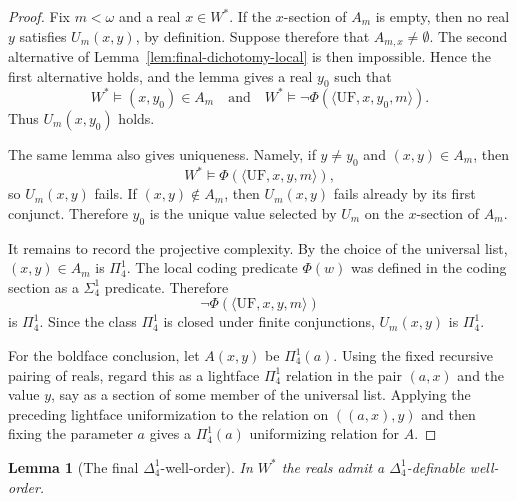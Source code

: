 \documentclass[a4paper,11pt]{article}
\newtheorem{lemma}[theorem]{Lemma}
\begin{document}
\begin{proof}
Fix \(m<\omega\) and a real \(x\in W^\ast\).  If the \(x\)-section of \(A_m\) is empty, then no real \(y\) satisfies \(U_m(x,y)\), by definition.  Suppose therefore that \(A_{m,x}\neq\emptyset\).  The second alternative of Lemma~\ref{lem:final-dichotomy-local} is then impossible.  Hence the first alternative holds, and the lemma gives a real \(y_0\) such that
\[
   W^\ast\models (x,y_0)\in A_m
   \quad\text{and}\quad
   W^\ast\models \neg\Phi(\langle\mathrm{UF},x,y_0,m\rangle).
\]
Thus \(U_m(x,y_0)\) holds.

The same lemma also gives uniqueness.  Namely, if \(y\neq y_0\) and \((x,y)\in A_m\), then
\[
   W^\ast\models \Phi(\langle\mathrm{UF},x,y,m\rangle),
\]
so \(U_m(x,y)\) fails.  If \((x,y)\notin A_m\), then \(U_m(x,y)\) fails already by its first conjunct.  Therefore \(y_0\) is the unique value selected by \(U_m\) on the \(x\)-section of \(A_m\).

It remains to record the projective complexity.  By the choice of the universal list, \((x,y)\in A_m\) is \(\Pi^1_4\).  The local coding predicate \(\Phi(w)\) was defined in the coding section as a \(\Sigma^1_4\) predicate.  Therefore
\[
   \neg\Phi(\langle\mathrm{UF},x,y,m\rangle)
\]
is \(\Pi^1_4\).  Since the class \(\Pi^1_4\) is closed under finite conjunctions, \(U_m(x,y)\) is \(\Pi^1_4\).

For the boldface conclusion, let \(A(x,y)\) be \(\Pi^1_4(a)\).  Using the fixed recursive pairing of reals, regard this as a lightface \(\Pi^1_4\) relation in the pair \((a,x)\) and the value \(y\), say as a section of some member of the universal list.  Applying the preceding lightface uniformization to the relation on \(((a,x),y)\) and then fixing the parameter \(a\) gives a \(\Pi^1_4(a)\) uniformizing relation for \(A\).
\end{proof}

\begin{lemma}[The final \(\Delta^1_4\)-well-order]\label{lem:final-delta14-wellorder}
In \(W^\ast\) the reals admit a \(\Delta^1_4\)-definable well-order.
\end{lemma}
\end{document}
